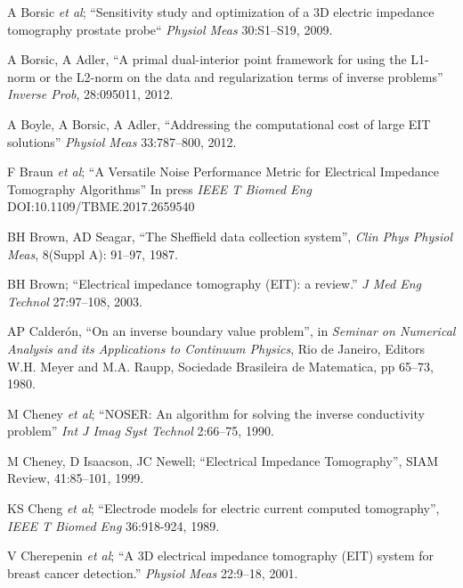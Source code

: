 \documentclass[12pt]{article} \usepackage[margin=3cm]{geometry} \usepackage[margin=20pt,font=small,labelfont=bf]{caption}\def\TBLWIDA{35mm}\def\TBLWIDB{95mm}
\newcommand{\ifmaxthree}[2]{#2 {\em et al}; }
\begin{document}
\begin{thebibliography}{00}
\ifmaxthree{
A Borsic, R Halter R, Y Wan, A Hartov, KD Paulsen,
}{
A Borsic
}
``Sensitivity study and optimization of a 3D electric impedance tomography prostate probe``
{\em Physiol Meas} 30:S1--S19, 2009.

A Borsic, A Adler,
``A primal dual-interior point framework for using the L1-norm or the L2-norm on the data and regularization terms of inverse problems''
{\em Inverse Prob}, 28:095011, 2012.

A Boyle, A Borsic, A Adler,
``Addressing the computational cost of large EIT solutions''
{\em Physiol Meas} 33:787--800, 2012.

\ifmaxthree{
F Braun, M Proença, J Solà, J-P Thiran, A Adler
}{
F Braun
}
``A Versatile Noise Performance Metric for
Electrical Impedance Tomography Algorithms''
In press {\em IEEE T Biomed Eng} DOI:10.1109/TBME.2017.2659540

BH Brown, AD Seagar,
``The Sheffield data collection system'',
{\em Clin Phys Physiol Meas}, 8(Suppl A): 91--97, 1987.

BH Brown;
``Electrical impedance tomography (EIT): a review.''
{\em  J Med Eng Technol} 27:97--108, 2003.

AP Calderón,
``On an inverse boundary value problem'', in
{\em Seminar on Numerical Analysis and its Applications to Continuum Physics}, Rio de Janeiro, Editors W.H. Meyer and M.A. Raupp, Sociedade Brasileira de Matematica, pp 65--73, 1980.

\ifmaxthree{
M Cheney, D Isaacson, JC Newell, S Simske, J Goble.
}{
M Cheney
}
``NOSER: An algorithm for solving the inverse conductivity problem''
{\em Int J Imag Syst Technol} 2:66--75, 1990.

M Cheney, D Isaacson, JC Newell;
``Electrical Impedance Tomography'',
SIAM Review, 41:85--101, 1999.

\ifmaxthree{
KS Cheng, D Isaacson, JC Newell, DG Gisser DG,
}{
KS Cheng
}
``Electrode models for electric current computed tomography'',
{\em IEEE T Biomed Eng} 36:918-924, 1989.

\ifmaxthree{
V Cherepenin, A Karpov, A Korjenevsky, V Kornienko, A Mazaletskaya, D Mazourov, D Meister
}{
V Cherepenin
}
``A 3D electrical impedance tomography (EIT) system for breast cancer detection.''
{\em Physiol Meas} 22:9--18, 2001. %


\end{thebibliography}
\end{document}
